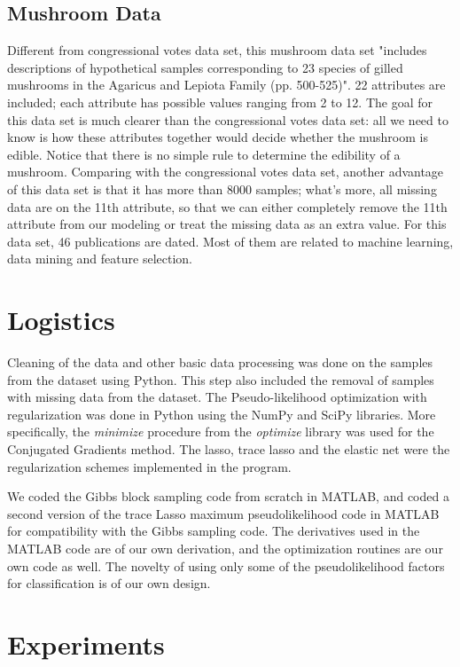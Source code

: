\documentclass[11pt]{article}
\begin{document}
\subsection{Mushroom Data}

Different from congressional votes data set, this mushroom data set "includes descriptions of hypothetical samples corresponding to 23 species of gilled mushrooms in the Agaricus and Lepiota Family (pp. 500-525)". 22 attributes are included; each attribute has possible values ranging from 2 to 12. The goal for this data set is much clearer than the congressional votes data set: all we need to know is how these attributes together would decide whether the mushroom is edible. Notice that there is no simple rule to determine the edibility of a mushroom. Comparing with the congressional votes data set, another advantage of this data set is that it has more than 8000 samples; what's more, all missing data are on the 11th attribute, so that we can either completely remove the 11th attribute from our modeling or treat the missing data as an extra value. For this data set, 46 publications are dated. Most of them are related to machine learning, data mining and feature selection.

\section{Logistics}

Cleaning of the data and other basic data processing was done on the samples from the dataset using Python. This step also included the removal of samples with missing data from the dataset. 
The Pseudo-likelihood optimization with regularization was done in Python using the NumPy and SciPy libraries. 
More specifically, the \textit{minimize} procedure from the \textit{optimize} library was used for the Conjugated Gradients method. 
The lasso, trace lasso and the elastic net were the regularization schemes implemented in the program.

We coded the Gibbs block sampling code from scratch in MATLAB, and coded a second version of the trace Lasso maximum pseudolikelihood code in MATLAB for compatibility with the Gibbs sampling code. The derivatives used in the MATLAB code are of our own derivation, and the optimization routines are our own code as well. The novelty of using only some of the pseudolikelihood factors for classification is of our own design.

\section{Experiments}
\end{document}
